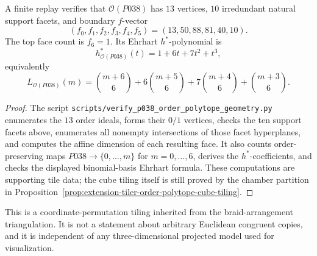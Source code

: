 \begin{proposition}
\label{prop:p038-certified-order-polytope-data}
A finite replay verifies that \(\mathcal O(P038)\) has \(13\) vertices,
\(10\) irredundant natural support facets, and boundary \(f\)-vector
\[
        (f_0,f_1,f_2,f_3,f_4,f_5)
        =(13,50,88,81,40,10).
\]
The top face count is \(f_6=1\).  Its Ehrhart \(h^*\)-polynomial is
\[
        h^*_{\mathcal O(P038)}(t)=1+6t+7t^2+t^3,
\]
equivalently
\[
        L_{\mathcal O(P038)}(m)=
        \binom{m+6}{6}
        +6\binom{m+5}{6}
        +7\binom{m+4}{6}
        +\binom{m+3}{6}.
\]
\end{proposition}

\begin{proof}
The script \texttt{scripts/verify\_p038\_order\_polytope\_geometry.py}
enumerates the \(13\) order ideals, forms their \(0/1\) vertices, checks the
ten support facets above, enumerates all nonempty intersections of those
facet hyperplanes, and computes the affine dimension of each resulting face.
It also counts order-preserving maps \(P038\to\{0,\ldots,m\}\) for
\(m=0,\ldots,6\), derives the \(h^*\)-coefficients, and checks the displayed
binomial-basis Ehrhart formula.  These computations are supporting tile data;
the cube tiling itself is still proved by the chamber partition in
Proposition~\ref{prop:extension-tiler-order-polytope-cube-tiling}.
\end{proof}

\begin{remark}
This is a coordinate-permutation tiling inherited from the braid-arrangement
triangulation.  It is not a statement about arbitrary Euclidean congruent
copies, and it is independent of any three-dimensional projected model used
for visualization.
\end{remark}
